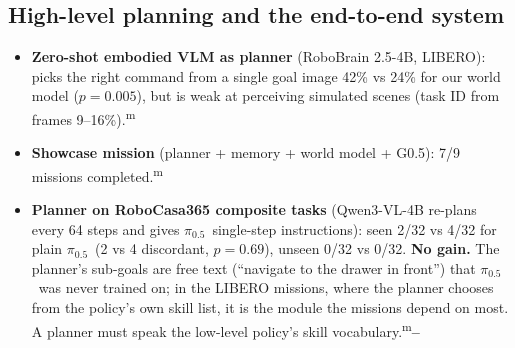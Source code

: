 \documentclass[10pt,a4paper]{article}
\newcommand{\pzf}{$\pi_{0.5}$}
\DeclareRobustCommand{\meas}{\textsuperscript{\textcolor{green!50!black}{m}}}
\newcommand{\negr}{\textcolor{red!70!black}{\textbf{--}}}
\begin{document}
\subsection{High-level planning and the end-to-end system}
\label{sec:res-e2e}
\begin{itemize}
\item \textbf{Zero-shot embodied VLM as planner} (RoboBrain 2.5-4B, LIBERO): picks the right command from a single goal image 42\% vs 24\% for our world model ($p=0.005$), but is weak at perceiving simulated scenes (task ID from frames 9--16\%).\meas
\item \textbf{Showcase mission} (planner + memory + world model + G0.5): 7/9 missions completed.\meas
\item \textbf{Planner on RoboCasa365 composite tasks} (Qwen3-VL-4B re-plans every 64 steps and gives \pzf\ single-step instructions): seen 2/32 vs 4/32 for plain \pzf\ (2 vs 4 discordant, $p=0.69$), unseen 0/32 vs 0/32. \textbf{No gain.} The planner's sub-goals are free text (``navigate to the drawer in front'') that \pzf\ was never trained on; in the LIBERO missions, where the planner chooses from the policy's own skill list, it is the module the missions depend on most. A planner must speak the low-level policy's skill vocabulary.\meas\negr
\end{itemize}
\end{document}
